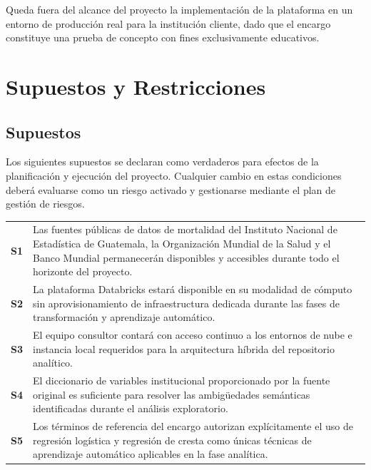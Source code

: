 \documentclass[12pt,a4paper]{article}
\begin{document}
Queda fuera del alcance del proyecto la implementación de la plataforma en un entorno de
producción real para la institución cliente, dado que el encargo constituye una prueba de concepto
con fines exclusivamente educativos.

\section{Supuestos y Restricciones}

\subsection{Supuestos}

Los siguientes supuestos se declaran como verdaderos para efectos de la planificación y
ejecución del proyecto. Cualquier cambio en estas condiciones deberá evaluarse como un riesgo
activado y gestionarse mediante el plan de gestión de riesgos.

\vspace{4pt}
{\small
\begin{tabular}{@{} >{\bfseries}p{0.6cm} p{13cm} @{}}
  S1 & Las fuentes públicas de datos de mortalidad del Instituto Nacional de Estadística de
       Guatemala, la Organización Mundial de la Salud y el Banco Mundial permanecerán
       disponibles y accesibles durante todo el horizonte del proyecto. \\[5pt]
  S2 & La plataforma Databricks estará disponible en su modalidad de cómputo sin
       aprovisionamiento de infraestructura dedicada durante las fases de transformación y
       aprendizaje automático. \\[5pt]
  S3 & El equipo consultor contará con acceso continuo a los entornos de nube e instancia
       local requeridos para la arquitectura híbrida del repositorio analítico. \\[5pt]
  S4 & El diccionario de variables institucional proporcionado por la fuente original es
       suficiente para resolver las ambigüedades semánticas identificadas durante el análisis
       exploratorio. \\[5pt]
  S5 & Los términos de referencia del encargo autorizan explícitamente el uso de regresión
       logística y regresión de cresta como únicas técnicas de aprendizaje automático
       aplicables en la fase analítica. \\
\end{tabular}
}
\end{document}
